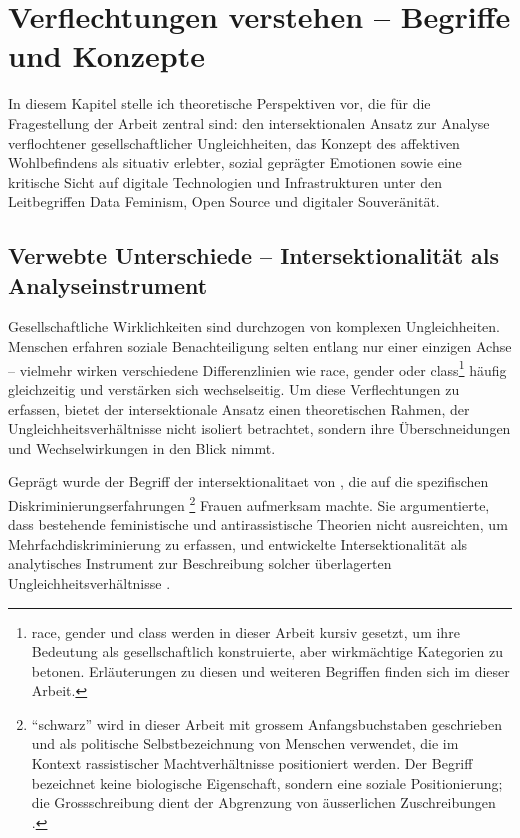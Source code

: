 
\chapter{Verflechtungen verstehen -- Begriffe und Konzepte} \label{sec:theoretischer_rahmen}

In diesem Kapitel stelle ich theoretische Perspektiven vor, die für die Fragestellung der Arbeit zentral sind: den intersektionalen Ansatz zur Analyse verflochtener gesellschaftlicher Ungleichheiten, das Konzept des affektiven Wohlbefindens als situativ erlebter, sozial geprägter Emotionen sowie eine kritische Sicht auf digitale Technologien und Infrastrukturen unter den Leitbegriffen Data Feminism, Open Source und digitaler Souveränität.


\section{Verwebte Unterschiede -- Intersektionalität als Analyseinstrument}

Gesellschaftliche Wirklichkeiten sind durchzogen von komplexen Ungleichheiten. Menschen erfahren soziale Benachteiligung selten entlang nur einer einzigen Achse -- vielmehr wirken verschiedene Differenzlinien wie \gls{race}, \gls{gender} oder \gls{class}\footnote{\gls{race}, \gls{gender} und \gls{class} werden in dieser Arbeit kursiv gesetzt, um ihre Bedeutung als gesellschaftlich konstruierte, aber wirkmächtige Kategorien zu betonen. Erläuterungen zu diesen und weiteren Begriffen finden sich im  dieser Arbeit.} häufig gleichzeitig und verstärken sich wechselseitig. Um diese Verflechtungen zu erfassen, bietet der intersektionale Ansatz einen theoretischen Rahmen, der Ungleichheitsverhältnisse nicht isoliert betrachtet, sondern ihre Überschneidungen und Wechselwirkungen in den Blick nimmt.

Geprägt wurde der Begriff der \gls{intersektionalitaet} von \textcite{crenshawMappingMarginsIntersectionality1991}, die auf die spezifischen Diskriminierungserfahrungen \footnote{\enquote{\gls{schwarz}} wird in dieser Arbeit mit grossem Anfangsbuchstaben geschrieben und als politische Selbstbezeichnung von Menschen verwendet, die im Kontext rassistischer Machtverhältnisse positioniert werden. Der Begriff bezeichnet keine biologische Eigenschaft, sondern eine soziale Positionierung; die Grossschreibung dient der Abgrenzung von äusserlichen Zuschreibungen \parencite{oguntoyeFarbeBekennenAfrodeutsche1986}.} Frauen aufmerksam machte. Sie argumentierte, dass bestehende feministische und antirassistische Theorien nicht ausreichten, um Mehrfachdiskriminierung zu erfassen, und entwickelte Intersektionalität als analytisches Instrument zur Beschreibung solcher überlagerten Ungleichheitsverhältnisse \parencite[\gls{vgl}][]{hancockWhenMultiplicationDoesnt2007}.

